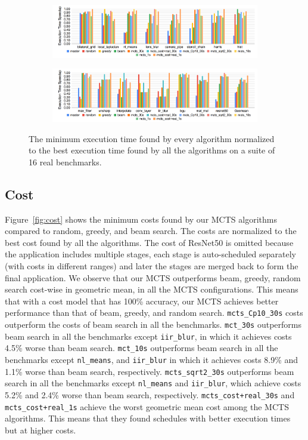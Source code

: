 \begin{figure}[!t]
    \centering
    \begin{subfigure}[t]{\textwidth}
        \centering
        \includegraphics[trim={0cm 2.9cm 0cm 0cm},clip,width=\textwidth]{figures/perf1.png}
    \end{subfigure}
    \begin{subfigure}[t]{\textwidth}
        \centering
        \includegraphics[width=\textwidth]{figures/perf2.png}
    \end{subfigure}
    \caption{The minimum execution time found by every algorithm normalized to the best execution time found by all the algorithms on a suite of 16 real benchmarks.}
    \label{fig:perf}
\end{figure}
\subsection{Cost}
Figure~\ref{fig:cost} shows the minimum costs found by our MCTS algorithms compared to random, greedy, and beam search. The costs are normalized to the best cost found by all the algorithms. The cost of ResNet50 is omitted because the application includes multiple stages, each stage is auto-scheduled separately (with costs in different ranges) and later the stages are merged back to form the final application.
We observe that our MCTS outperforms beam, greedy, random search cost-wise in geometric mean, in all the MCTS configurations. This means that with a cost model that has 100\% accuracy, our MCTS achieves better performance than that of beam, greedy, and random search. \texttt{mcts\_Cp10\_30s} costs outperform the costs of beam search in all the benchmarks. \texttt{mct\_30s} outperforms beam search in all the benchmarks except \texttt{iir\_blur}, in which it achieves costs 4.5\% worse than beam search. \texttt{mct\_10s} outperforms beam search in all the benchmarks except \texttt{nl\_means}, and \texttt{iir\_blur} in which it achieves costs 8.9\% and 1.1\% worse than beam search, respectively. \texttt{mcts\_sqrt2\_30s} outperforms beam search in all the benchmarks except \texttt{nl\_means} and \texttt{iir\_blur}, which achieve  costs 5.2\% and 2.4\% worse than beam search, respectively. \texttt{mcts\_cost+real\_30s} and \texttt{mcts\_cost+real\_1s} achieve the worst geometric mean cost among the MCTS algorithms. This means that they found schedules with better execution times but at higher costs. 

